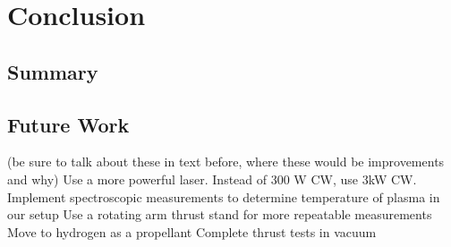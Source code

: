 \chapter{Conclusion}

    \section{Summary}


    \section{Future Work}
        (be sure to talk about these in text before, where these would be improvements and why)
        Use a more powerful laser. Instead of 300 W CW, use 3kW CW.
        Implement spectroscopic measurements to determine temperature of plasma in our setup
        Use a rotating arm thrust stand for more repeatable measurements
        Move to hydrogen as a propellant
        Complete thrust tests in vacuum
